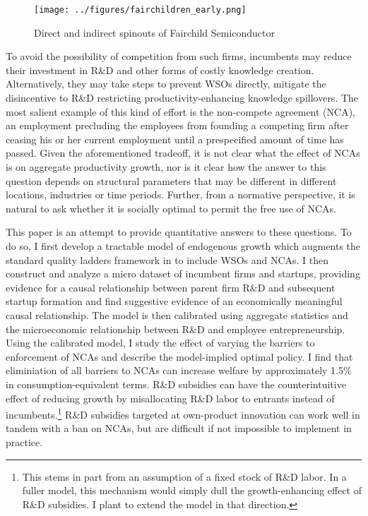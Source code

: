 \documentclass[11pt,english]{article}
\begin{document}
\begin{figure}	
	\center
	\texttt{[image: ../figures/fairchildren\_early.png]}
	\caption{Direct and indirect spinouts of Fairchild Semiconductor}
	\label{fairchild_spinouts}
\end{figure}


To avoid the possibility of competition from such firms, incumbents may reduce their investment in R\&D and other forms of costly knowledge creation. Alternatively, they may take steps to prevent WSOs directly, mitigate the disincentive to R\&D restricting productivity-enhancing knowledge spillovers. The most salient example of this kind of effort is the non-compete agreement (NCA), an employment precluding the employees from founding a competing firm after ceasing his or her current employment until a prespecified amount of time has passed. Given the aforementioned tradeoff, it is not clear what the effect of NCAs is on aggregate productivity growth, nor is it clear how the answer to this question depends on structural parameters that may be different in different locations, industries or time periods. Further, from a normative perspective, it is natural to ask whether it is socially optimal to permit the free use of NCAs.

This paper is an attempt to provide quantitative answers to these questions. To do so, I first develop a tractable model of endogenous growth which augments the standard quality ladders framework in \cite{acemoglu_introduction_2009} to include WSOs and NCAs. I then construct and analyze a micro dataset of incumbent firms and startups, providing evidence for a causal relationship between parent firm R\&D and subsequent startup formation and find suggestive evidence of an economically meaningful causal relationship. The model is then calibrated using aggregate statistics and the microeconomic relationship between R\&D and employee entrepreneurship. Using the calibrated model, I study the effect of varying the barriers to enforcement of NCAs and describe the model-implied optimal policy. I find that eliminiation of all barriers to NCAs can increase welfare by approximately 1.5\% in consumption-equivalent terms. R\&D subsidies can have the counterintuitive effect of reducing growth by misallocating R\&D labor to entrants instead of incumbents.\footnote{This stems in part from an assumption of a fixed stock of R\&D labor. In a fuller model, this mechanism would simply dull the growth-enhancing effect of R\&D subsidies. I plant to extend the model in that direction.} R\&D subsidies targeted at own-product innovation can work well in tandem with a ban on NCAs, but are difficult if not impossible to implement in practice.
\end{document}

